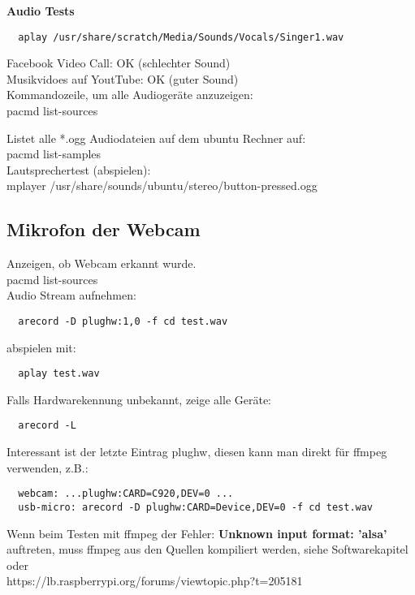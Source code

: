 \textbf{Audio Tests}
\begin{verbatim}
  aplay /usr/share/scratch/Media/Sounds/Vocals/Singer1.wav
\end{verbatim}
Facebook Video Call: OK (schlechter Sound)\\
Musikvidoes auf YoutTube: OK (guter Sound)\\

Kommandozeile, um alle Audiogeräte anzuzeigen:\\
pacmd list-sources

Listet alle *.ogg Audiodateien auf dem ubuntu Rechner auf:\\
pacmd list-samples\\
Lautsprechertest (abspielen):\\
mplayer /usr/share/sounds/ubuntu/stereo/button-pressed.ogg 

\subsection{Mikrofon der Webcam}
Anzeigen, ob Webcam erkannt wurde.\\
pacmd list-sources\\ 

Audio Stream aufnehmen:
\begin{verbatim}
  arecord -D plughw:1,0 -f cd test.wav
\end{verbatim}
abspielen mit:
\begin{verbatim}
  aplay test.wav
\end{verbatim}

Falls Hardwarekennung unbekannt, zeige alle Geräte:
\begin{verbatim}
  arecord -L
\end{verbatim}
Interessant ist der letzte Eintrag plughw, diesen kann man direkt für
ffmpeg verwenden, z.B.:
\begin{verbatim}
  webcam: ...plughw:CARD=C920,DEV=0 ...
  usb-micro: arecord -D plughw:CARD=Device,DEV=0 -f cd test.wav
\end{verbatim}

Wenn beim Testen mit ffmpeg der Fehler: 
\textbf{Unknown input format: 'alsa'}\\ 
auftreten, muss ffmpeg aus den Quellen kompiliert werden, siehe 
Softwarekapitel oder\\ 
https://lb.raspberrypi.org/forums/viewtopic.php?t=205181

